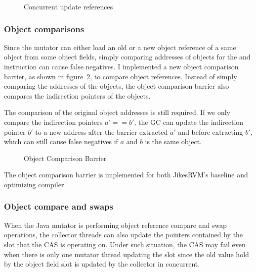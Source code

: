 \begin{figure}
  \centering
  
  \caption{Concurrent update references}
  \label{fig:concupdaterefs}
\end{figure}

\subsubsection{Object comparisons}

Since the mutator can either load an old or a new object reference of a same object
from some object fields, simply comparing addresses of objects for the  and 
instruction can cause false negatives. I implemented a new object comparison barrier,
as shown in figure~\ref{fig:objectcomparisonbarrier}, to compare object references.
Instead of simply comparing the addresses of the objects, the object comparison barrier also
compares the indirection pointers of the objects.

The comparison of the original object addresses is still required. If we only compare the
indirection pointers $a' == b'$, the GC can update the indirection pointer $b'$ to a new
address after the barrier extracted $a'$ and before extracting $b'$, which can still cause false
negatives if $a$ and $b$ is the same object.

\begin{figure}
  \centering
  
  \caption{Object Comparison Barrier}
  \label{fig:objectcomparisonbarrier}
\end{figure}

The object comparison barrier is implemented for both JikesRVM's baseline and optimizing compiler.

\subsubsection{Object compare and swaps}

When the Java mutator is performing object reference compare and swap operations,
the collector threads can also update the pointers contained by the slot that the CAS
is operating on. Under such situation, the CAS may fail even when there is only one mutator
thread updating the slot since the old value hold by the object field slot is updated
by the collector in concurrent.

